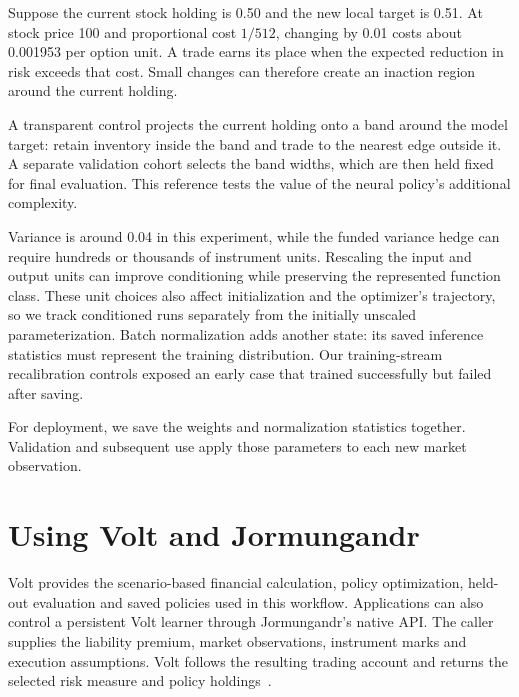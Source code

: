 \documentclass[8pt]{strategynet-journal}
\begin{document}
\begin{SNcolumns}
Suppose the current stock holding is 0.50 and the new local target is 0.51.
At stock price 100 and proportional cost $1/512$, changing by 0.01 costs about
0.001953 per option unit. A trade earns its place when the expected reduction
in risk exceeds that cost. Small changes can therefore create an inaction
region around the current holding.

A transparent control projects the current holding onto a band around the
model target: retain inventory inside the band and trade to the nearest edge
outside it. A separate validation cohort selects the band widths, which are
then held fixed for final evaluation. This reference tests the value of the
neural policy's additional complexity.

Variance is around 0.04 in this experiment, while the funded variance hedge
can require hundreds or thousands of instrument units. Rescaling the input and output units can improve conditioning while
preserving the represented function class. These unit choices also affect
initialization and the optimizer's trajectory, so we track conditioned runs
separately from the initially unscaled parameterization.
Batch normalization adds another state: its saved inference statistics must
represent the training distribution. Our training-stream recalibration controls
exposed an early case that trained successfully but failed after saving.

For deployment, we save the weights and normalization statistics together.
Validation and subsequent use apply those parameters to each new market
observation.

\section{Using Volt and Jormungandr}
Volt provides the scenario-based financial calculation, policy optimization,
held-out evaluation and saved policies used in this workflow. Applications
can also control a persistent Volt learner through Jormungandr's native API.
The caller supplies the liability premium, market observations, instrument
marks and execution assumptions. Volt follows the resulting trading account
and returns the selected risk measure and policy holdings~\cite{nativevolt,nativejorm}.


\end{SNcolumns}
\end{document}
